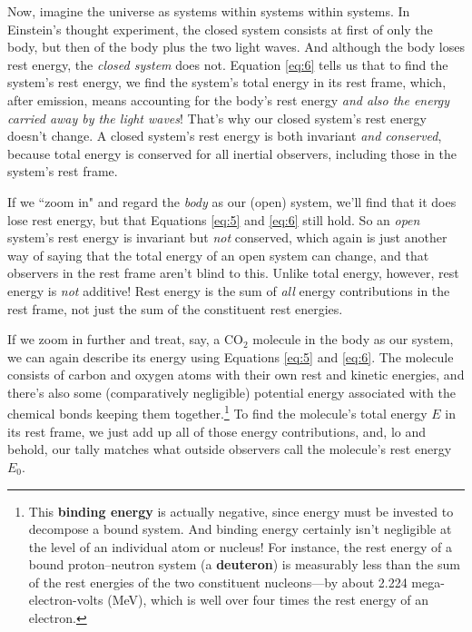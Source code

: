 \documentclass[12pt]{article}
\begin{document}
Now, imagine the universe as systems within systems within systems. In Einstein's thought experiment, the closed system consists at first of only the body, but then of the body plus the two light waves. And although the body loses rest energy, the \emph{closed system} does not. Equation \ref{eq:6} tells us that to find the system's rest energy, we find the system's total energy in its rest frame, which, after emission, means accounting for the body's rest energy \emph{and also the energy carried away by the light waves}! That's why our closed system's rest energy doesn't change. A closed system's rest energy is both invariant \emph{and conserved}, because total energy is conserved for all inertial observers, including those in the system's rest frame.

If we ``zoom in" and regard the \emph{body} as our (open) system, we'll find that it does lose rest energy, but that Equations \ref{eq:5} and \ref{eq:6} still hold. So an \emph{open} system's rest energy is invariant but \emph{not} conserved, which again is just another way of saying that the total energy of an open system can change, and that observers in the rest frame aren't blind to this. Unlike total energy, however, rest energy is \emph{not} additive! Rest energy is the sum of \emph{all} energy contributions in the rest frame, not just the sum of the constituent rest energies.

If we zoom in further and treat, say, a CO$_2$ molecule in the body as our system, we can again describe its energy using Equations \ref{eq:5} and \ref{eq:6}. The molecule consists of carbon and oxygen atoms with their own rest and kinetic energies, and there's also some (comparatively negligible) potential energy associated with the chemical bonds keeping them together.\footnote{\label{fn:be}This \textbf{binding energy} is actually negative, since energy must be invested to decompose a bound system. And binding energy certainly isn't negligible at the level of an individual atom or nucleus! For instance, the rest energy of a bound proton--neutron system (a \textbf{deuteron}) is measurably less than the sum of the rest energies of the two constituent nucleons---by about 2.224 mega-electron-volts (MeV), which is well over four times the rest energy of an electron.} To find the molecule's total energy $E$ in its rest frame, we just add up all of those energy contributions, and, lo and behold, our tally matches what outside observers call the molecule's rest energy $E_0$.
\end{document}
